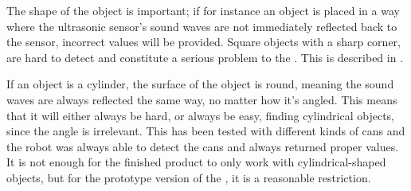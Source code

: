 The shape of the object is important; if for instance an object is placed in a way where the ultrasonic sensor's sound waves are not immediately reflected back to the sensor, incorrect values will be provided. Square objects with a sharp corner, are hard to detect and constitute a serious problem to the \projname{}. This is described in . 

If an object is a cylinder, the surface of the object is round, meaning the sound waves are always reflected the same way, no matter how it's angled. This means that it will either always be hard, or always be easy, finding cylindrical objects, since the angle is irrelevant. This has been tested with different kinds of cans and the robot was always able to detect the cans and always returned proper values. It is not enough for the finished product to only work with cylindrical-shaped objects, but for the prototype version of the \projname{}, it is a reasonable restriction.

